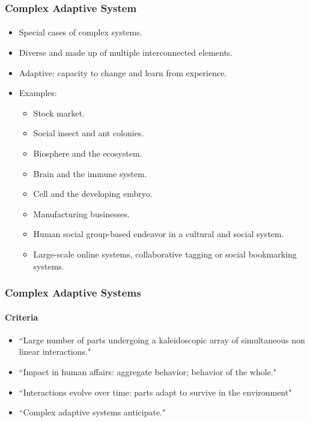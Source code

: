 \frame
{
	\frametitle{Complex Adaptive System}
	\framesubtitle{}

	\begin{itemize}
		\item Special cases of complex systems.
		\item Diverse and made up of multiple interconnected elements.
		\item Adaptive: capacity to change and learn from experience.
		\item Examples:
		\begin{itemize}
			\item Stock market.
			\item Social insect and ant colonies.
			\item Biosphere and the ecosystem.
			\item Brain and the immune system.
			\item Cell and the developing embryo.
			\item Manufacturing businesses.
			\item Human social group-based endeavor in a cultural and social system.
			\item Large-scale online systems, collaborative tagging or social bookmarking systems.
		\end{itemize}
	\end{itemize}
}

\frame
{
	\frametitle{Complex Adaptive Systems}
	\framesubtitle{Criteria}

	\begin{itemize}
		\item ``Large number of parts undergoing a kaleidoscopic array of simultaneous non linear interactions."
		\item ``Impact in human affairs: aggregate behavior; behavior of the whole."
		\item ``Interactions evolve over time: parts adapt to survive in the environment"
		\item ``Complex adaptive systems anticipate."
	\end{itemize}
}

